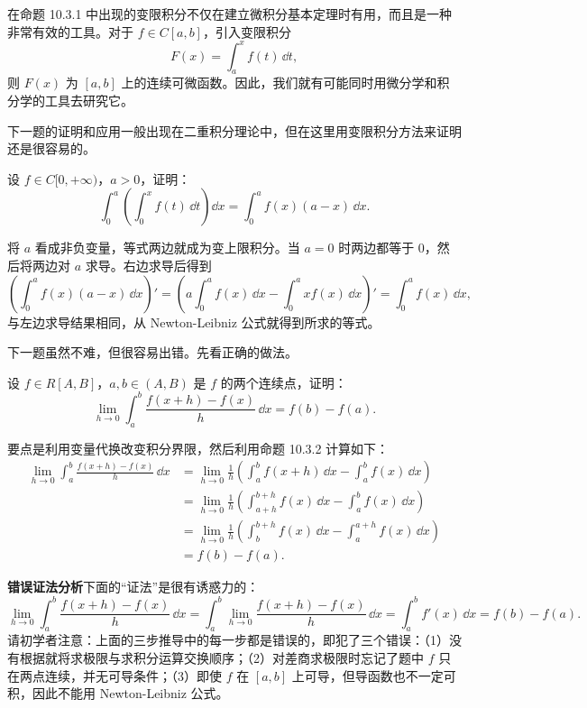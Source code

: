 在命题 10.3.1 中出现的变限积分不仅在建立微积分基本定理时有用，而且是一种非常有效的工具。对于 $f\in C[a,b]$，引入变限积分
\[
  F(x)=\int_a^x f(t)\,\dd t,
\]
则 $F(x)$ 为 $[a,b]$ 上的连续可微函数。因此，我们就有可能同时用微分学和积分学的工具去研究它。

下一题的证明和应用一般出现在二重积分理论中，但在这里用变限积分方法来证明还是很容易的。

\begin{xexample}[10.3.1]
设 $f\in C[0,+\infty)$，$a>0$，证明：
\[
  \int_0^a\left(\int_0^x f(t)\,\dd t\right)\dd x
  =\int_0^a f(x)(a-x)\,\dd x.
\]
\end{xexample}
\begin{xsolution}
将 $a$ 看成非负变量，等式两边就成为变上限积分。当 $a=0$ 时两边都等于 0，然后将两边对 $a$ 求导。右边求导后得到
\[
  \left(\int_0^a f(x)(a-x)\,\dd x\right)'
  =\left(a\int_0^a f(x)\,\dd x-\int_0^a xf(x)\,\dd x\right)'
  =\int_0^a f(x)\,\dd x,
\]
与左边求导结果相同，从 Newton-Leibniz 公式就得到所求的等式。
\end{xsolution}

下一题虽然不难，但很容易出错。先看正确的做法。

\begin{xexample}[10.3.2]
设 $f\in R[A,B]$，$a,b\in(A,B)$ 是 $f$ 的两个连续点，证明：
\[
  \lim_{h\to0}\int_a^b\frac{f(x+h)-f(x)}{h}\,\dd x=f(b)-f(a).
\]
\end{xexample}
\begin{xsolution}
要点是利用变量代换改变积分界限，然后利用命题 10.3.2 计算如下：
\begin{align*}
  \lim_{h\to0}\int_a^b\frac{f(x+h)-f(x)}h\,\dd x
  &=\lim_{h\to0}\frac1h\left(\int_a^b f(x+h)\,\dd x-\int_a^b f(x)\,\dd x\right)\\
  &=\lim_{h\to0}\frac1h\left(\int_{a+h}^{b+h}f(x)\,\dd x-\int_a^b f(x)\,\dd x\right)\\
  &=\lim_{h\to0}\frac1h\left(\int_b^{b+h}f(x)\,\dd x-\int_a^{a+h}f(x)\,\dd x\right)\\
  &=f(b)-f(a).
\end{align*}
\end{xsolution}

\begin{xremark}
\textbf{错误证法分析}\quad 下面的“证法”是很有诱惑力的：
\[
  \lim_{h\to0}\int_a^b\frac{f(x+h)-f(x)}h\,\dd x
  =\int_a^b\lim_{h\to0}\frac{f(x+h)-f(x)}h\,\dd x
  =\int_a^b f'(x)\,\dd x=f(b)-f(a).
\]
请初学者注意：上面的三步推导中的每一步都是错误的，即犯了三个错误：（1）没有根据就将求极限与求积分运算交换顺序；（2）对差商求极限时忘记了题中 $f$ 只在两点连续，并无可导条件；（3）即使 $f$ 在 $[a,b]$ 上可导，但导函数也不一定可积，因此不能用 Newton-Leibniz 公式。
\end{xremark}

